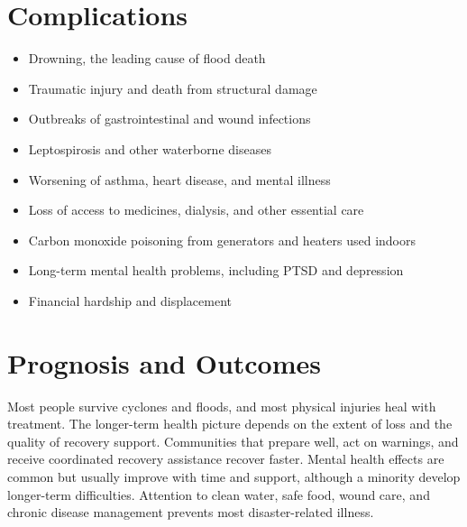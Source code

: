 \section*{Complications}
\begin{itemize}
    \item Drowning, the leading cause of flood death
    \item Traumatic injury and death from structural damage
    \item Outbreaks of gastrointestinal and wound infections
    \item Leptospirosis and other waterborne diseases
    \item Worsening of asthma, heart disease, and mental illness
    \item Loss of access to medicines, dialysis, and other essential care
    \item Carbon monoxide poisoning from generators and heaters used indoors
    \item Long-term mental health problems, including PTSD and depression
    \item Financial hardship and displacement
\end{itemize}

\section*{Prognosis and Outcomes}
Most people survive cyclones and floods, and most physical injuries heal with treatment. The longer-term health picture depends on the extent of loss and the quality of recovery support. Communities that prepare well, act on warnings, and receive coordinated recovery assistance recover faster. Mental health effects are common but usually improve with time and support, although a minority develop longer-term difficulties. Attention to clean water, safe food, wound care, and chronic disease management prevents most disaster-related illness.

